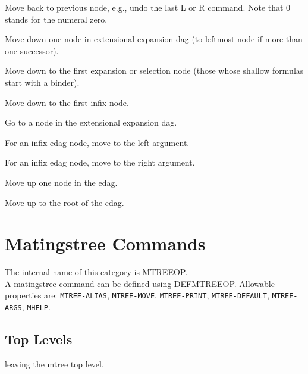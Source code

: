 \begin{description} 
\item[0]  
Move back to previous node, e.g., undo the last L or R
command. Note that 0 stands for the numeral zero.

\item[D]  
Move down one node in extensional expansion dag
(to leftmost node if more than one successor).

\item[FB]  
Move down to the first expansion or selection node
(those whose shallow formulas start with a binder).

\item[FI]  
Move down to the first infix node.

\item[GOTO]  
Go to a node in the extensional expansion dag.

\item[L]  
For an infix edag node, move to the left argument.

\item[R]  
For an infix edag node, move to the right argument.

\item[UP]  
Move up one node in the edag.

\item[\textasciicircum ] \index{\textasciicircum } 
Move up to the root of the edag.
\item
\end{description}
\chapter{Matingstree Commands}
The internal name of this category is 
MTREEOP.\\
A matingstree command can be defined using DEFMTREEOP.
Allowable properties are: \texttt{MTREE-ALIAS}, \texttt{MTREE-MOVE}, \texttt{MTREE-PRINT}, \texttt{MTREE-DEFAULT}, \texttt{MTREE-ARGS}, \texttt{MHELP}.

\section{Top Levels}

\begin{description} 
\item[LEAVE]  
leaving the mtree top level.
\item
\end{description}

